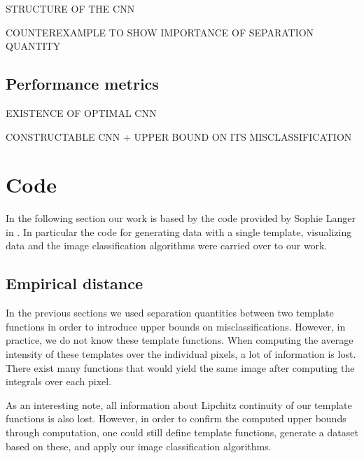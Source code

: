 \documentclass{article}
\theoremstyle{definition}
\theoremstyle{remark}
\theoremstyle{proposition}
\begin{document}
        STRUCTURE OF THE CNN

        COUNTEREXAMPLE TO SHOW IMPORTANCE OF SEPARATION QUANTITY
        
        \subsection{Performance metrics}

        EXISTENCE OF OPTIMAL CNN

        CONSTRUCTABLE CNN + UPPER BOUND ON ITS MISCLASSIFICATION
        
        \section{Code}
            In the following section our work is based by the code provided by Sophie Langer in \cite{Image-deformation-model}. In particular the code for generating data with a single template, visualizing data and the image classification algorithms were carried over to our work.

            

            \subsection{Empirical distance}

            In the previous sections we used separation quantities between two template functions in order to introduce upper bounds on misclassifications. However, in practice, we do not know these template functions. When computing the average intensity of these templates over the individual pixels, a lot of information is lost. There exist many functions that would yield the same image after computing the integrals over each pixel.

            As an interesting note, all information about Lipchitz continuity of our template functions is also lost. However, in order to confirm the computed upper bounds through computation, one could still define template functions, generate a dataset based on these, and apply our image classification algorithms.
\end{document}
